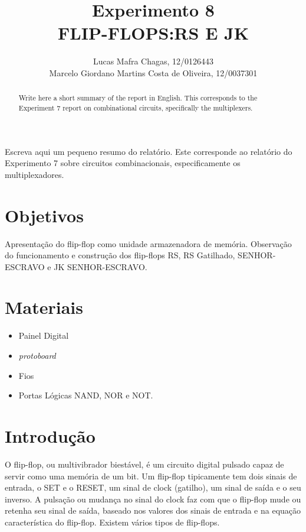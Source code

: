 \documentclass[12pt]{article}
\title{Experimento 8\\ 
	FLIP-FLOPS:RS E JK}
\author{
	Lucas Mafra Chagas, 12/0126443 \\
	Marcelo Giordano Martins Costa de Oliveira,  12/0037301
}
\begin{document}
 

\maketitle

 \begin{abstract}
   Write here a short summary of the report in English. This corresponds to the Experiment 7 report on combinational circuits, specifically the multiplexers.
 \end{abstract}
     
 \begin{resumo} 
  Escreva aqui um pequeno resumo do relatório. Este corresponde ao relatório do Experimento 7 sobre circuitos combinacionais, especificamente os multiplexadores.
 \end{resumo}


\section{Objetivos}
\label{sec:Objetivos}

Apresentação do flip-flop como unidade armazenadora de memória. Observação do funcionamento e construção dos flip-flops RS, RS Gatilhado, SENHOR-ESCRAVO e JK SENHOR-ESCRAVO.

\section{Materiais} 
\label{sec:Materiais}

\begin{itemize}
    \item Painel Digital
    
    \item \textit{protoboard}
    
    \item Fios
    
    \item Portas Lógicas NAND, NOR e NOT.
    
\end{itemize}


\section{Introdução}
\label{sec:Introducao}

O flip-flop, ou multivibrador biestável, é um circuito digital pulsado capaz de servir como uma memória de um bit. Um flip-flop tipicamente tem dois sinais de entrada, o SET e o RESET, um sinal de clock (gatilho), um sinal de saída e o seu inverso. A pulsação ou mudança no sinal do clock faz com que o flip-flop mude ou retenha seu sinal de saída, baseado nos valores dos sinais de entrada e na equação característica do flip-flop. Existem vários tipos de flip-flops.
\end{document}
